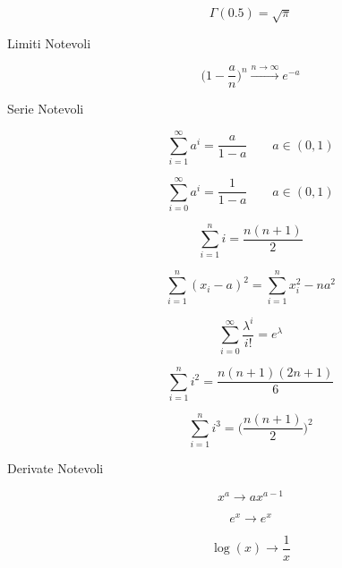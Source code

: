 \begin{description}
	\begin{equation}
	\Gamma(0.5) = \sqrt{\pi}
	\end{equation}
	
	\item[Limiti Notevoli]
	\begin{equation}
	\Bigg(1-\frac{a}{n}\Bigg)^{n} \overset{n\rightarrow\infty}{\rightarrow} e^{-a}
	\end{equation}
	
	\item[Serie Notevoli]
	\begin{equation}
	\sum_{i=1}^{\infty} a^{i} = \frac{a}{1-a} \qquad a\in(0,1)
	\end{equation}
	
	\begin{equation}
	\sum_{i=0}^{\infty} a^{i} = \frac{1}{1-a} \qquad a\in(0,1)
	\end{equation}
	
	\begin{equation}
	\sum_{i=1}^{n} i = \frac{n(n+1)}{2}
	\end{equation}
	
	\begin{equation}
	\sum_{i=1}^{n} (x_{i}-a)^{2} = 	\sum_{i=1}^{n} x_{i}^{2}-na^{2}
	\end{equation}
	
	\begin{equation}
	\sum_{i=0}^{\infty} \frac{\lambda^{i}}{i!} = e^{\lambda}
	\end{equation}
	
	\begin{equation}
	\sum_{i=1}^{n} i^{2} = \frac{n(n+1)(2n+1)}{6}
	\end{equation}
	
	\begin{equation}
	\sum_{i=1}^{n} i^{3} = \Bigg(\frac{n(n+1)}{2}\Bigg)^{2}
	\end{equation}
	
	\item[Derivate Notevoli]
	\begin{equation}
	x^{a} \rightarrow ax^{a-1}
	\end{equation}
	
	\begin{equation}
	e^{x} \rightarrow e^{x}
	\end{equation}
	
	\begin{equation}
	\log(x) \rightarrow \frac{1}{x}
	\end{equation}
	

\end{description}
